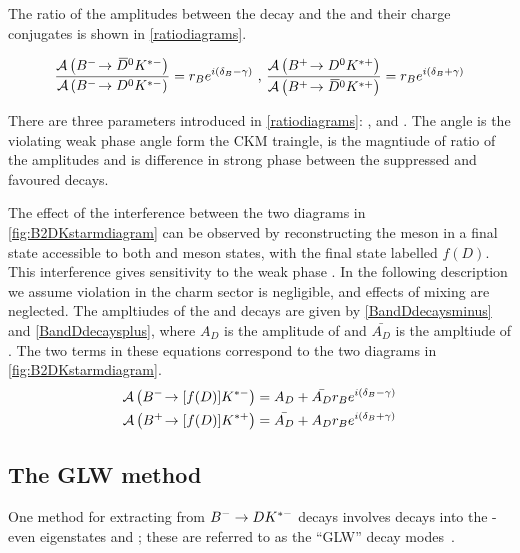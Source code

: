 The ratio of the amplitudes between the \decay{\Bm}{\Dzb\Kstarm} decay and the \decay{\Bm}{\Dz\Kstarm} and their charge conjugates is shown in \eqn\ref{ratiodiagrams}.

\begin{equation}
\frac{\mathcal{A}\left({{{B}^-}}\!\rightarrow {\ensuremath{{\kern 0.2em\overline{\kern -0.2em D}{}}{}^0}}{\ensuremath{{K}^{*-}}}\right)}{\mathcal{A}\left({{{B}^-}}\!\rightarrow {\ensuremath{{D}^0}}{\ensuremath{{K}^{*-}}}\right)} = r_B e^{i(\delta_B - \gamma)} \text{ , }
\frac{\mathcal{A}\left({{{B}^+}}\!\rightarrow {\ensuremath{{D}^0}}{\ensuremath{{K}^{*+}}}\right)}{\mathcal{A}\left({{{B}^+}}\!\rightarrow {\ensuremath{{\kern 0.2em\overline{\kern -0.2em D}{}}{}^0}}{\ensuremath{{K}^{*+}}}\right)} = r_B e^{i(\delta_B + \gamma)}
\label{ratiodiagrams}
\end{equation}

There are three parameters introduced in \eqn\ref{ratiodiagrams}: \rb, \deltab and \Pgamma. The angle \Pgamma is the \CP violating weak phase angle form the CKM traingle, \rb is the magntiude of ratio of the amplitudes and \deltab is difference in strong phase between the suppressed and favoured decays.

The effect of the interference between the two diagrams in \fig\ref{fig:B2DKstarmdiagram} can be observed by reconstructing the \D meson in a final state accessible to both \Dz and \Dzb meson states, with the final state labelled $f(D)$. This interference gives sensitivity to the weak phase \Pgamma. In the following description we assume \CP violation in the charm sector is negligible, and effects of \D mixing are neglected. The ampltiudes of the \Bm and \Bp decays are given by \eqn\ref{BandDdecaysminus} and \ref{BandDdecaysplus}, where $A_D$ is the amplitude of  and $\bar{A_{D}}$ is the ampltiude of . The two terms in these equations correspond to the two diagrams in \fig\ref{fig:B2DKstarmdiagram}.
\begin{align}
\mathcal{A}\left({{{B}^-}}\!\rightarrow [f(D)]{\ensuremath{{K}^{*-}}}\right) &= A_{D} + \bar{A_{D}}r_B e^{i(\delta_B - \gamma)} \label{BandDdecaysminus} \\
\mathcal{A}\left({{{B}^+}}\!\rightarrow [f(D)]{\ensuremath{{K}^{*+}}}\right) &= \bar{A_{D}} + A_{D}r_B e^{i(\delta_B + \gamma)} \label{BandDdecaysplus}
\end{align}


\subsection{The GLW method}

One method for extracting \Pgamma from ${{{B}^-}} \rightarrow {\ensuremath{D}}{\ensuremath{{K}^{*-}}}$ decays involves \D decays into the \CP-even eigenstates \Kp\Km and \pip\pim; these are referred to as the ``GLW'' decay modes~\cite{GL,GW}.

